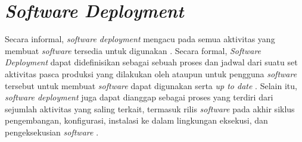 \section{\textit{Software Deployment}}
Secara informal, \textit{software deployment} mengacu pada semua aktivitas yang membuat \textit{software} tersedia untuk digunakan \parencite{softwareDeploymentCarzaniga1998characterization}. Secara formal, \textit{Software Deployment} dapat didefinisikan sebagai sebuah proses dan jadwal dari suatu set aktivitas pasca produksi yang dilakukan oleh ataupun untuk pengguna \textit{software} tersebut untuk membuat \textit{software} dapat digunakan serta \textit{up to date} \parencite{ARCANGELI2015198}. Selain itu, \textit{software deployment} juga dapat dianggap sebagai proses yang terdiri dari sejumlah aktivitas yang saling terkait, termasuk rilis \textit{software} pada akhir siklus pengembangan, konfigurasi, instalasi ke dalam lingkungan eksekusi, dan pengeksekusian \textit{software} \parencite{softwareDeploymentFuturePast}.







